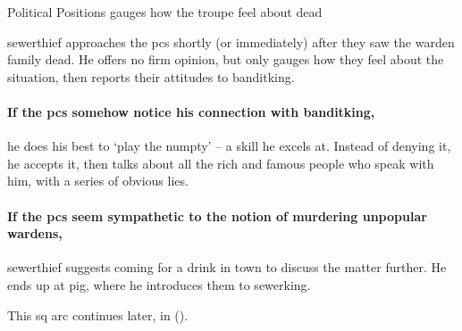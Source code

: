 {Political Positions}%
{ gauges how the troupe feel about dead }%
\label{politicalPositions}

\Gls{sewerthief} approaches the \glspl{pc} shortly (or immediately) after they saw the \gls{warden} family dead.%
He offers no firm opinion, but only gauges how they feel about the situation, then reports their attitudes to \gls{banditking}.%


\paragraph{If the \glspl{pc} somehow notice his connection with \gls{banditking},}
he does his best to `play the numpty' -- a skill he excels at.
Instead of denying it, he accepts it, then talks about all the rich and famous people who speak with him, with a series of obvious lies.

\paragraph{If the \glspl{pc} seem sympathetic to the notion of murdering unpopular \glspl{warden},}
\gls{sewerthief} suggests coming for a drink in \gls{town} to discuss the matter further.
He ends up at \gls{pig}, where he introduces them to \gls{sewerking}.

\bigLine

This \gls{sq} arc continues later, in  ().

